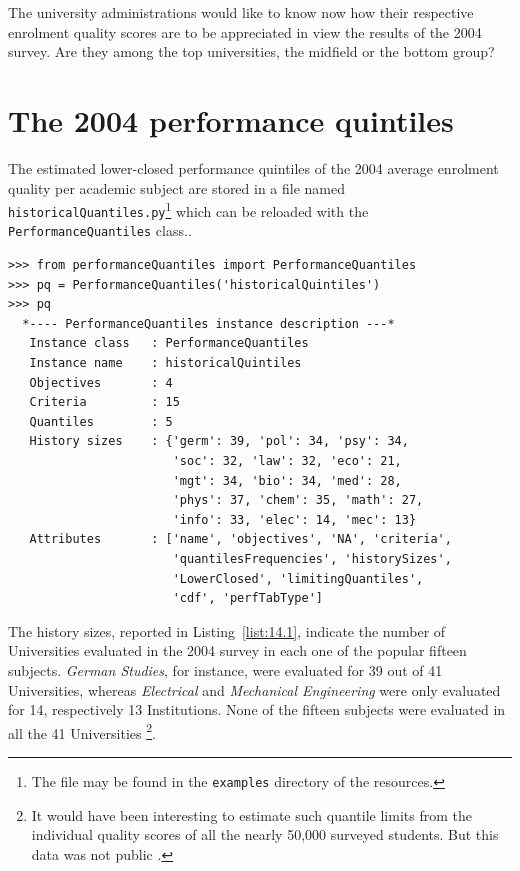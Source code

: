 The university administrations would like to know now how their respective enrolment quality scores are to be appreciated in view the results of the 2004 \Spiegel survey. Are they among the top universities, the midfield or the bottom group?

\section{The 2004 performance quintiles}
\label{sec:14.2}

The estimated lower-closed performance quintiles of the 2004 average enrolment quality per academic subject are stored in a file named \texttt{historicalQuan\-tiles.py}\footnote{The file may be found in the \texttt{examples} directory of the \Digraph resources.} which can be reloaded with the \texttt{PerformanceQuantiles} class..
\begin{lstlisting}[caption={Inspecting stored historical performance quantiles},label=list:14.1]
>>> from performanceQuantiles import PerformanceQuantiles
>>> pq = PerformanceQuantiles('historicalQuintiles')
>>> pq
  *---- PerformanceQuantiles instance description ---*
   Instance class   : PerformanceQuantiles
   Instance name    : historicalQuintiles
   Objectives       : 4
   Criteria         : 15
   Quantiles        : 5
   History sizes    : {'germ': 39, 'pol': 34, 'psy': 34,
                       'soc': 32, 'law': 32, 'eco': 21,
                       'mgt': 34, 'bio': 34, 'med': 28,
                       'phys': 37, 'chem': 35, 'math': 27,
                       'info': 33, 'elec': 14, 'mec': 13}
   Attributes       : ['name', 'objectives', 'NA', 'criteria',
                       'quantilesFrequencies', 'historySizes',
                       'LowerClosed', 'limitingQuantiles',
                       'cdf', 'perfTabType']
\end{lstlisting}

The history sizes, reported in Listing~\vref{list:14.1}, indicate the number of Universities evaluated in the 2004 survey in each one of the popular fifteen subjects. \emph{German Studies}, for instance, were evaluated for 39 out of 41 Universities, whereas \emph{Electrical} and \emph{Mechanical Engineering} were only evaluated for 14, respectively 13 Institutions. None of the fifteen subjects were evaluated in all the 41 Universities \footnote{It would have been interesting to estimate such quantile limits from the individual quality scores of all the nearly 50,000 surveyed students. But this data was not public \citep{SPI-2004}.}.                      

